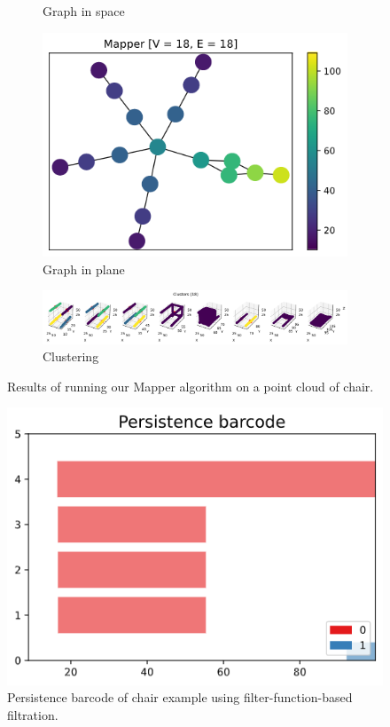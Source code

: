 \documentclass{article}
\begin{document}
\begin{figure}[ht]
\begin{subfigure}[c]{0.25\columnwidth}
        \caption{Graph in space}
        \label{fig:chair-space}
    \end{subfigure}
    \begin{subfigure}[c]{0.3\columnwidth}
        \centering
        \includegraphics[width=\textwidth]{chair-graph-2d}
        \caption{Graph in plane}
        \label{fig:chair-plane}
    \end{subfigure}
    \begin{subfigure}[c]{0.9\columnwidth}
        \centering
        \includegraphics[width=\textwidth]{chair-clusters}
        \caption{Clustering}
        \label{fig:chair-cluster}
    \end{subfigure}
    \caption{Results of running our Mapper algorithm on a point cloud of chair.}
    \label{fig:chair}
\end{figure}

\begin{figure}[ht]
    \centering
    \includegraphics[width=0.5\columnwidth]{chair-barcode}
    \caption{Persistence barcode of chair example using filter-function-based filtration.}
    \label{fig:chair-persistence}
\end{figure}
\end{document}
